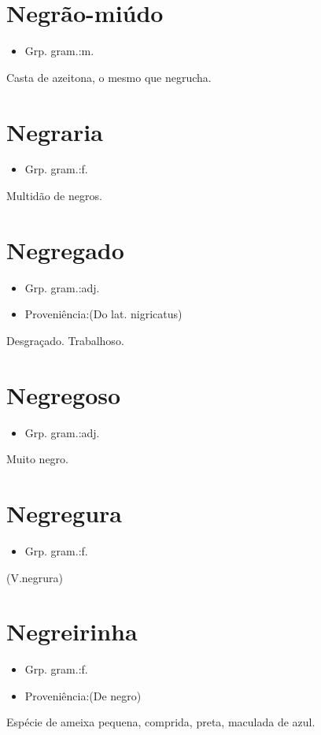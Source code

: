 \section{Negrão-miúdo}
\begin{itemize}
\item {Grp. gram.:m.}
\end{itemize}
Casta de azeitona, o mesmo que \textunderscore negrucha\textunderscore .
\section{Negraria}
\begin{itemize}
\item {Grp. gram.:f.}
\end{itemize}
Multidão de negros.
\section{Negregado}
\begin{itemize}
\item {Grp. gram.:adj.}
\end{itemize}
\begin{itemize}
\item {Proveniência:(Do lat. \textunderscore nigricatus\textunderscore )}
\end{itemize}
Desgraçado.
Trabalhoso.
\section{Negregoso}
\begin{itemize}
\item {Grp. gram.:adj.}
\end{itemize}
Muito negro.
\section{Negregura}
\begin{itemize}
\item {Grp. gram.:f.}
\end{itemize}
(V.negrura)
\section{Negreirinha}
\begin{itemize}
\item {Grp. gram.:f.}
\end{itemize}
\begin{itemize}
\item {Proveniência:(De \textunderscore negro\textunderscore )}
\end{itemize}
Espécie de ameixa pequena, comprida, preta, maculada de azul.
